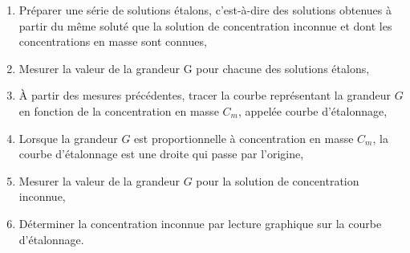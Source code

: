 \begin{tcolorbox}[colback=red!5!white,colframe=red!75!black,title=\textbf{Protocole expérimental pour réaliser une courbe d'étalonnage: }, upperbox=invisible]
\begin{enumerate}
    \item Préparer une série de solutions étalons, c’est-à-dire des solutions obtenues à partir du même soluté que la solution de concentration inconnue et dont les concentrations en masse sont connues,
    \item Mesurer la valeur de la grandeur G pour chacune des solutions étalons,
    \item À partir des mesures précédentes, tracer la courbe représentant la grandeur $G$ en fonction de la concentration en masse $C_m$, appelée courbe d’étalonnage,
    \item Lorsque la grandeur $G$ est proportionnelle à concentration en masse $C_m$, la courbe d’étalonnage est une droite qui passe par l’origine,
    \item Mesurer la valeur de la grandeur $G$ pour la solution de concentration inconnue,
    \item Déterminer la concentration inconnue par lecture graphique sur la courbe d’étalonnage.
\end{enumerate}
\end{tcolorbox}